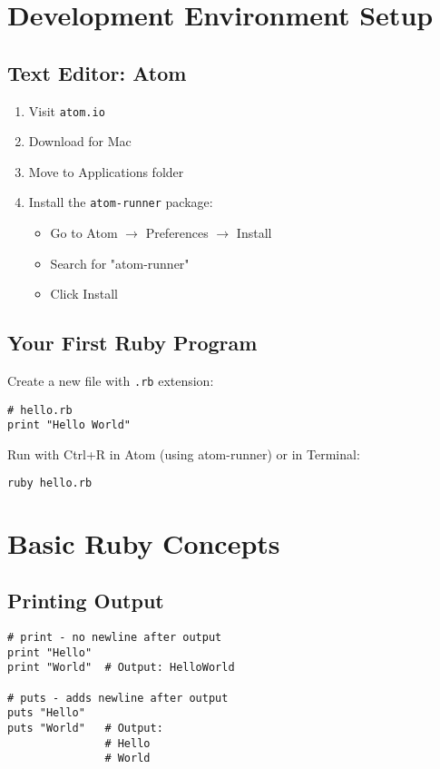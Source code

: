 \documentclass[12pt,a4paper]{article}
\begin{document}
\section{Development Environment Setup}

\subsection{Text Editor: Atom}
\begin{enumerate}
    \item Visit \texttt{atom.io}
    \item Download for Mac
    \item Move to Applications folder
    \item Install the \texttt{atom-runner} package:
    \begin{itemize}
        \item Go to Atom $\rightarrow$ Preferences $\rightarrow$ Install
        \item Search for "atom-runner"
        \item Click Install
    \end{itemize}
\end{enumerate}

\subsection{Your First Ruby Program}

Create a new file with \texttt{.rb} extension:

\begin{lstlisting}
# hello.rb
print "Hello World"
\end{lstlisting}

Run with Ctrl+R in Atom (using atom-runner) or in Terminal:
\begin{lstlisting}[language=bash]
ruby hello.rb
\end{lstlisting}

\section{Basic Ruby Concepts}

\subsection{Printing Output}

\begin{lstlisting}
# print - no newline after output
print "Hello"
print "World"  # Output: HelloWorld

# puts - adds newline after output
puts "Hello"
puts "World"   # Output: 
               # Hello
               # World
\end{lstlisting}
\end{document}
